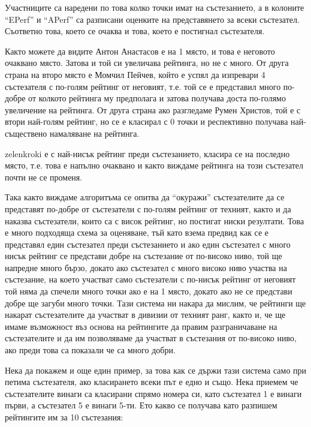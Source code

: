 \documentclass[a4paper,12pt]{article}
\begin{document}
  Участниците са наредени по това колко точки имат на състезанието, а в колоните ``EPerf'' и ``APerf'' са разписани оценките на представянето за всеки състезател. Съответно това, което се очаква и това, което е постигнал състезателя.
  
  Както можете да видите Антон Анастасов е на 1 място, и това е неговото очаквано място. Затова и той си увеличава рейтинга, но не с много. От друга страна на второ място е Момчил Пейчев, който е успял да изпревари 4 състезателя с по-голям рейтинг от неговият, т.е. той се е представил много по-добре от колкото рейтинга му предполага и затова получава доста по-голямо увеличение на рейтинга. От друга страна ако разгледаме Румен Христов, той е с втори най-голям рейтинг, но се е класирал с 0 точки и респективно получава най-съществено намаляване на рейтинга.
  
  zelenkroki е с най-нисък рейтинг преди състезанието, класира се на последно място, т.е. това е напълно очаквано и както виждаме рейтинга на този състезател почти не се променя.
  
  Така както виждаме алгоритъма се опитва да ``окуражи'' състезателите да се представят по-добре от състезатели с по-голям рейтинг от техният, както и да наказва състезатели, които са с висок рейтинг, но постигат ниски резултати. Това е много подходяща схема за оценяване, тъй като взема предвид как се е представял един състезател преди състезанието и ако един състезател с много нисък рейтинг се представи добре на състезание от по-високо ниво, той ще напредне много бързо, докато ако състезател с много високо ниво участва на състезание, на което участват само състезатели с по-нисък рейтинг от неговият той няма да спечели много точки ако е на 1 място, докато ако не се представи добре ще загуби много точки. Тази система ни накара да мислим, че рейтинги ще накарат състезателите да участват в дивизии от техният ранг, както и, че ще имаме възможност въз основа на рейтингите да правим разграничаване на състезателите и да им позволяваме да участват в състезания от по-високо ниво, ако преди това са показали че са много добри.
  
  Нека да покажем и още един пример, за това как се държи тази система само при петима състезателя, ако класирането всеки път е едно и също. Нека приемем че състезателите винаги са класирани спрямо номера си, като състезател 1 е винаги първи, а състезател 5 е винаги 5-ти. Ето какво се получава като разпишем рейтингите им за 10 състезания:
\end{document}
